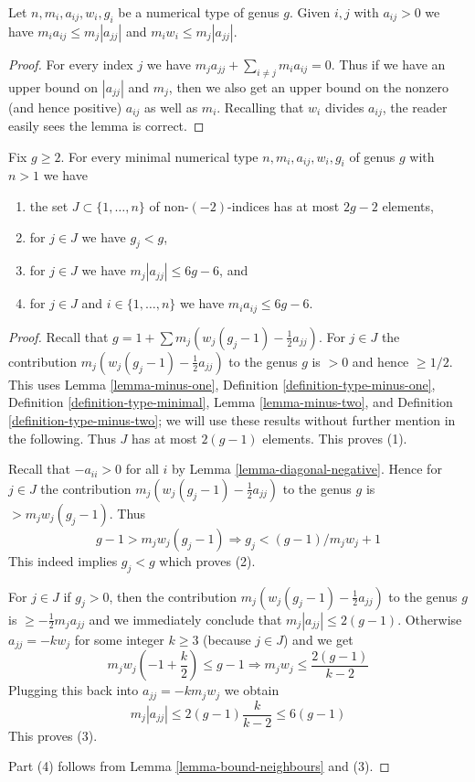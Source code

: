 \begin{lemma}
\label{lemma-bound-neighbours}
Let $n, m_i, a_{ij}, w_i, g_i$ be a numerical type of genus $g$.
Given $i, j$ with $a_{ij} > 0$ we have
$m_ia_{ij} \leq m_j|a_{jj}|$ and $m_iw_i \leq m_j|a_{jj}|$.
\end{lemma}

\begin{proof}
For every index $j$ we have $m_j a_{jj} + \sum_{i \not = j} m_ia_{ij} = 0$.
Thus if we have an upper bound on $|a_{jj}|$ and $m_j$, then we also get an
upper bound on the nonzero (and hence positive) $a_{ij}$ as well as
$m_i$. Recalling that $w_i$ divides $a_{ij}$, the reader easily sees
the lemma is correct.
\end{proof}

\begin{lemma}
\label{lemma-bound-heart}
Fix $g \geq 2$. For every minimal numerical type $n, m_i, a_{ij}, w_i, g_i$
of genus $g$ with $n > 1$ we have
\begin{enumerate}
\item the set $J \subset \{1, \ldots, n\}$ of non-$(-2)$-indices
has at most $2g - 2$ elements,
\item for $j \in J$ we have $g_j < g$,
\item for $j \in J$ we have $m_j|a_{jj}| \leq 6g - 6$, and
\item for $j \in J$ and $i \in \{1, \ldots, n\}$
we have $m_ia_{ij} \leq 6g - 6$.
\end{enumerate}
\end{lemma}

\begin{proof}
Recall that $g = 1 + \sum m_j(w_j(g_j - 1) - \frac{1}{2} a_{jj})$.
For $j \in J$ the contribution $m_j(w_j(g_j - 1) - \frac{1}{2} a_{jj})$
to the genus $g$ is $> 0$ and hence $\geq 1/2$. This uses
Lemma \ref{lemma-minus-one},
Definition \ref{definition-type-minus-one},
Definition \ref{definition-type-minimal},
Lemma \ref{lemma-minus-two}, and
Definition \ref{definition-type-minus-two}; we will use these
results without further mention in the following.
Thus $J$ has at most $2(g - 1)$ elements.
This proves (1).

\medskip\noindent
Recall that $-a_{ii} > 0$ for all $i$ by Lemma \ref{lemma-diagonal-negative}.
Hence for $j \in J$ the contribution $m_j(w_j(g_j - 1) - \frac{1}{2} a_{jj})$
to the genus $g$ is $> m_jw_j(g_j - 1)$. Thus
$$
g - 1 > m_jw_j(g_j - 1) \Rightarrow g_j < (g - 1)/m_jw_j + 1
$$
This indeed implies $g_j < g$ which proves (2).

\medskip\noindent
For $j \in J$ if $g_j > 0$, then the contribution
$m_j(w_j(g_j - 1) - \frac{1}{2} a_{jj})$ to the genus $g$
is $\geq -\frac{1}{2}m_ja_{jj}$ and we immediately conclude
that $m_j|a_{jj}| \leq 2(g - 1)$. Otherwise $a_{jj} = -kw_j$
for some integer $k \geq 3$ (because $j \in J$) and we get
$$
m_jw_j(-1 + \frac{k}{2}) \leq g - 1
\Rightarrow
m_jw_j \leq \frac{2(g - 1)}{k - 2}
$$
Plugging this back into $a_{jj} = -km_jw_j$ we obtain
$$
m_j|a_{jj}| \leq 2(g - 1) \frac{k}{k - 2} \leq 6(g - 1)
$$
This proves (3).

\medskip\noindent
Part (4) follows from Lemma \ref{lemma-bound-neighbours} and (3).
\end{proof}

